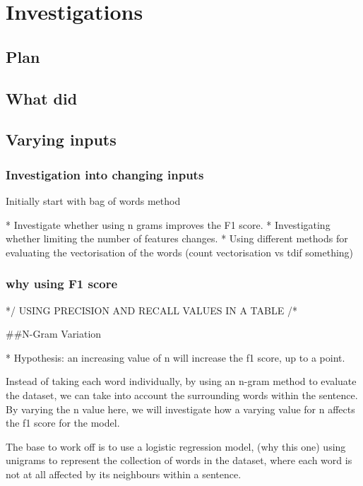 
\section{Investigations}

\subsection{Plan}


\subsection{What did}

\subsection{Varying inputs}



\subsubsection{Investigation into changing inputs}

Initially start with bag of words method 

* Investigate whether using n grams improves the F1 score.
* Investigating whether limiting the number of features changes. 
* Using different methods for evaluating the vectorisation of the words (count vectorisation vs tdif something)

\subsubsection{why using F1 score}




*/ USING PRECISION AND RECALL VALUES IN A TABLE /*

##N-Gram Variation

* Hypothesis: an increasing value of n will increase the f1 score, up to a point.

Instead of taking each word individually, by using an n-gram method to evaluate the dataset, we can take into account the surrounding words within the sentence.
By varying the n value here, we will investigate how a varying value for n affects the f1 score for the model.

The base to work off is to use a logistic regression model, (why this one) using unigrams to represent the collection of words in the dataset, 
where each word is not at all affected by its neighbours within a sentence. 

